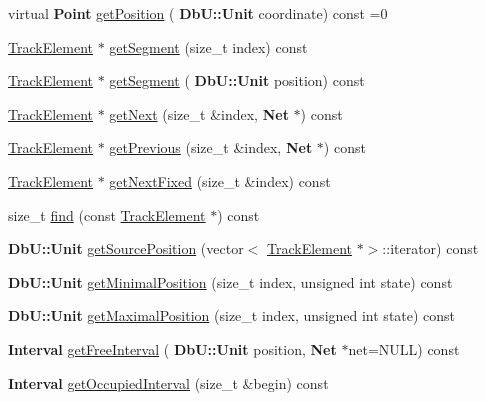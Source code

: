 \begin{DoxyCompactItemize}
\item 
virtual \textbf{ Point} \hyperlink{classKite_1_1Track_a2a033f90e528d3d07aa33694dd733200}{get\+Position} (\textbf{ Db\+U\+::\+Unit} coordinate) const =0
\item 
\hyperlink{classKite_1_1TrackElement}{Track\+Element} $\ast$ \hyperlink{classKite_1_1Track_acb93796a96c9737133fb5d90837ab81d}{get\+Segment} (size\+\_\+t index) const
\item 
\hyperlink{classKite_1_1TrackElement}{Track\+Element} $\ast$ \hyperlink{classKite_1_1Track_a6962a27db7ae946217ea692983fc6a8c}{get\+Segment} (\textbf{ Db\+U\+::\+Unit} position) const
\item 
\hyperlink{classKite_1_1TrackElement}{Track\+Element} $\ast$ \hyperlink{classKite_1_1Track_af3db59591bef3c690ace92c114a4e4aa}{get\+Next} (size\+\_\+t \&index, \textbf{ Net} $\ast$) const
\item 
\hyperlink{classKite_1_1TrackElement}{Track\+Element} $\ast$ \hyperlink{classKite_1_1Track_a290fcfe6131730d216951a3b5207d777}{get\+Previous} (size\+\_\+t \&index, \textbf{ Net} $\ast$) const
\item 
\hyperlink{classKite_1_1TrackElement}{Track\+Element} $\ast$ \hyperlink{classKite_1_1Track_a72e18efeecb4641a1ad2989d80b48fec}{get\+Next\+Fixed} (size\+\_\+t \&index) const
\item 
size\+\_\+t \hyperlink{classKite_1_1Track_a73cdc70609df1c89393542f301746622}{find} (const \hyperlink{classKite_1_1TrackElement}{Track\+Element} $\ast$) const
\item 
\textbf{ Db\+U\+::\+Unit} \hyperlink{classKite_1_1Track_ab26eeaf466b6b5ba863f73abb3fbfa9a}{get\+Source\+Position} (vector$<$ \hyperlink{classKite_1_1TrackElement}{Track\+Element} $\ast$$>$\+::iterator) const
\item 
\textbf{ Db\+U\+::\+Unit} \hyperlink{classKite_1_1Track_a22b708f606d8d95b52e297d7bc2cab55}{get\+Minimal\+Position} (size\+\_\+t index, unsigned int state) const
\item 
\textbf{ Db\+U\+::\+Unit} \hyperlink{classKite_1_1Track_a68124797edd88ebaf3c9aa00d6ee7822}{get\+Maximal\+Position} (size\+\_\+t index, unsigned int state) const
\item 
\textbf{ Interval} \hyperlink{classKite_1_1Track_aa9c09467d45d95b3ac2b58f09c04ff8d}{get\+Free\+Interval} (\textbf{ Db\+U\+::\+Unit} position, \textbf{ Net} $\ast$net=N\+U\+LL) const
\item 
\textbf{ Interval} \hyperlink{classKite_1_1Track_ae87a2e7c9632b60737162295542e3e93}{get\+Occupied\+Interval} (size\+\_\+t \&begin) const
$$
\end{DoxyCompactItemize}
